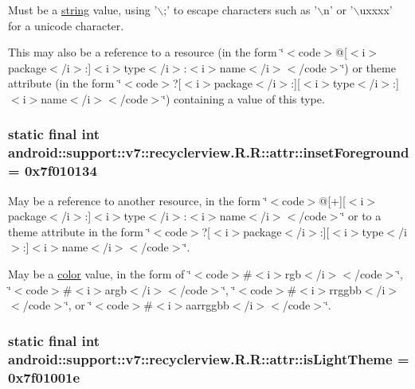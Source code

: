 Must be a \hyperlink{classandroid_1_1support_1_1v7_1_1recyclerview_1_1_r_1_1string}{string} value, using '$\backslash$;' to escape characters such as '$\backslash$n' or '$\backslash$uxxxx' for a unicode character. 

This may also be a reference to a resource (in the form \char`\"{}$<$code$>$@\mbox{[}$<$i$>$package$<$/i$>$:\mbox{]}$<$i$>$type$<$/i$>$:$<$i$>$name$<$/i$>$$<$/code$>$\char`\"{}) or theme attribute (in the form \char`\"{}$<$code$>$?\mbox{[}$<$i$>$package$<$/i$>$:\mbox{]}\mbox{[}$<$i$>$type$<$/i$>$:\mbox{]}$<$i$>$name$<$/i$>$$<$/code$>$\char`\"{}) containing a value of this type. \hypertarget{classandroid_1_1support_1_1v7_1_1recyclerview_1_1_r_1_1attr_4de2c41d484c3a4bed4dc99488aff179}{
\subsubsection[{insetForeground}]{\setlength{\rightskip}{0pt plus 5cm}static final int android::support::v7::recyclerview.R.R::attr::insetForeground = 0x7f010134}}
\label{classandroid_1_1support_1_1v7_1_1recyclerview_1_1_r_1_1attr_4de2c41d484c3a4bed4dc99488aff179}


May be a reference to another resource, in the form \char`\"{}$<$code$>$@\mbox{[}+\mbox{]}\mbox{[}$<$i$>$package$<$/i$>$:\mbox{]}$<$i$>$type$<$/i$>$:$<$i$>$name$<$/i$>$$<$/code$>$\char`\"{} or to a theme attribute in the form \char`\"{}$<$code$>$?\mbox{[}$<$i$>$package$<$/i$>$:\mbox{]}\mbox{[}$<$i$>$type$<$/i$>$:\mbox{]}$<$i$>$name$<$/i$>$$<$/code$>$\char`\"{}. 

May be a \hyperlink{classandroid_1_1support_1_1v7_1_1recyclerview_1_1_r_1_1color}{color} value, in the form of \char`\"{}$<$code$>$\#$<$i$>$rgb$<$/i$>$$<$/code$>$\char`\"{}, \char`\"{}$<$code$>$\#$<$i$>$argb$<$/i$>$$<$/code$>$\char`\"{}, \char`\"{}$<$code$>$\#$<$i$>$rrggbb$<$/i$>$$<$/code$>$\char`\"{}, or \char`\"{}$<$code$>$\#$<$i$>$aarrggbb$<$/i$>$$<$/code$>$\char`\"{}. \hypertarget{classandroid_1_1support_1_1v7_1_1recyclerview_1_1_r_1_1attr_875053021b0011652dcde16d72ba8e44}{
\subsubsection[{isLightTheme}]{\setlength{\rightskip}{0pt plus 5cm}static final int android::support::v7::recyclerview.R.R::attr::isLightTheme = 0x7f01001e}}
\label{classandroid_1_1support_1_1v7_1_1recyclerview_1_1_r_1_1attr_875053021b0011652dcde16d72ba8e44}


